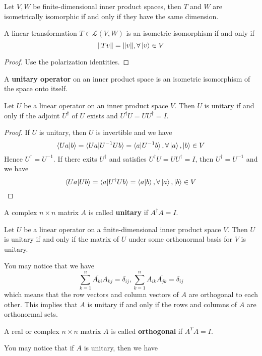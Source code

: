 \documentclass{article}
\begin{document}
\begin{coro}
	Let $V,W$ be finite-dimensional inner product spaces, then $T$ and $W$ are isometrically isomorphic if and only if they have the same dimension.
\end{coro}
\begin{thm}
	A linear transformation $T\in\mathcal{L}(V,W)$ is an isometric isomorphism if and only if 
	\[\Vert Tv\Vert=\Vert v\Vert,\forall\ket{v}\in V\]
\end{thm}
\begin{proof}
	Use the polarization identities.
\end{proof}
\begin{dde}
	A \textbf{unitary operator} on an inner product space is an isometric isomorphism of the space onto itself.
\end{dde}
\begin{thm}
	Let $U$ be a linear operator on an inner product space $V$. Then $U$ is unitary if and only if the adjoint $U^\dagger$ of $U$ exists and $U^\dagger U=UU^\dagger=I$.
\end{thm}
\begin{proof}
	If $U$ is unitary, then $U$ is invertible and we have
	\[\braket{Ua|b}=\braket{Ua|U^{-1}Ub}=\braket{a|U^{-1}b},\forall\ket{a},\ket{b}\in V\]
	Hence $U^\dagger=U^{-1}$. If there exits $U^\dagger$ and satisfies $U^\dagger U=UU^\dagger=I$, then $U^\dagger=U^{-1}$ and we have
	\[\braket{Ua|Ub}=\braket{a|U^\dagger Ub}=\braket{a|b},\forall\ket{a},\ket{b}\in V\]
\end{proof}
\begin{dde}
	A complex $n\times n$ matrix $A$ is called \textbf{unitary} if $A^\dagger A=I$.
\end{dde}
\begin{thm}
	Let $U$ be a linear operator on a finite-dimensional inner product space $V$. Then $U$ is unitary if and only if the matrix of $U$ under some orthonormal basis for $V$ is unitary.
\end{thm}
You may notice that we have
\[\sum_{k=1}^n\overline{A_{ki}}A_{kj}=\delta_{ij},\sum_{k=1}^nA_{ik}\overline{A_{jk}}=\delta_{ij}\]
which means that the row vectors and column vectors of $A$ are orthogonal to each other. This implies that $A$ is unitary if and only if the rows and columns of $A$ are orthonormal sets.
\begin{dde}
	A real or complex $n\times n$ matrix $A$ is called \textbf{orthogonal} if $A^TA=I$.
\end{dde}
You may notice that if $A$ is unitary, then we have
\end{document}
